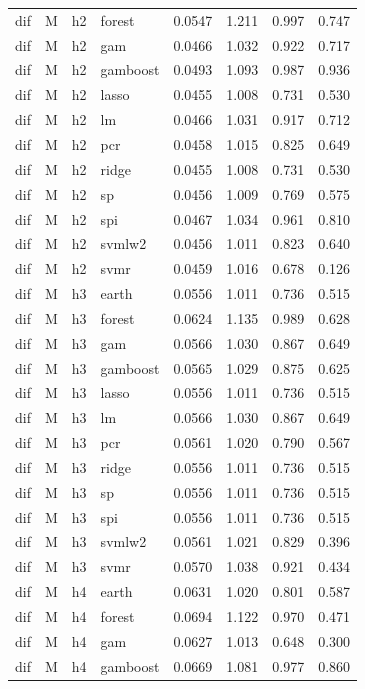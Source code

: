 \begin{ThreePartTable}
\begin{longtable}[t]{llclcccc}
dif & M & h2 & forest & 0.0547 & 1.211 & 0.997 & 0.747\\
dif & M & h2 & gam & 0.0466 & 1.032 & 0.922 & 0.717\\
dif & M & h2 & gamboost & 0.0493 & 1.093 & 0.987 & 0.936\\
dif & M & h2 & lasso & 0.0455 & 1.008 & 0.731 & 0.530\\
dif & M & h2 & lm & 0.0466 & 1.031 & 0.917 & 0.712\\
dif & M & h2 & pcr & 0.0458 & 1.015 & 0.825 & 0.649\\
dif & M & h2 & ridge & 0.0455 & 1.008 & 0.731 & 0.530\\
dif & M & h2 & sp & 0.0456 & 1.009 & 0.769 & 0.575\\
dif & M & h2 & spi & 0.0467 & 1.034 & 0.961 & 0.810\\
dif & M & h2 & svmlw2 & 0.0456 & 1.011 & 0.823 & 0.640\\
dif & M & h2 & svmr & 0.0459 & 1.016 & 0.678 & 0.126\\
\addlinespace
dif & M & h3 & earth & 0.0556 & 1.011 & 0.736 & 0.515\\
dif & M & h3 & forest & 0.0624 & 1.135 & 0.989 & 0.628\\
dif & M & h3 & gam & 0.0566 & 1.030 & 0.867 & 0.649\\
dif & M & h3 & gamboost & 0.0565 & 1.029 & 0.875 & 0.625\\
dif & M & h3 & lasso & 0.0556 & 1.011 & 0.736 & 0.515\\
dif & M & h3 & lm & 0.0566 & 1.030 & 0.867 & 0.649\\
dif & M & h3 & pcr & 0.0561 & 1.020 & 0.790 & 0.567\\
dif & M & h3 & ridge & 0.0556 & 1.011 & 0.736 & 0.515\\
dif & M & h3 & sp & 0.0556 & 1.011 & 0.736 & 0.515\\
dif & M & h3 & spi & 0.0556 & 1.011 & 0.736 & 0.515\\
dif & M & h3 & svmlw2 & 0.0561 & 1.021 & 0.829 & 0.396\\
dif & M & h3 & svmr & 0.0570 & 1.038 & 0.921 & 0.434\\
\addlinespace
dif & M & h4 & earth & 0.0631 & 1.020 & 0.801 & 0.587\\
dif & M & h4 & forest & 0.0694 & 1.122 & 0.970 & 0.471\\
dif & M & h4 & gam & 0.0627 & 1.013 & 0.648 & 0.300\\
dif & M & h4 & gamboost & 0.0669 & 1.081 & 0.977 & 0.860\\

\end{longtable}
\end{ThreePartTable}
